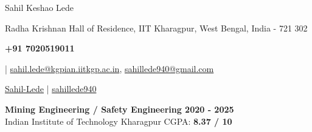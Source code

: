 \documentclass[10pt]{article}
\begin{document}
\begin{center}
    {\Huge Sahil Keshao Lede }\\
\end{center}
\vspace{-2.5ex}
\begin{center}
    {
    \small Radha Krishnan Hall of Residence, IIT Kharagpur, West Bengal, India - 721 302  

    \faMobile\hspace{0.2ex} \textbf{+91 7020519011} } |
    \Letter\hspace{0.2ex}
    \href{mailto:sahil.lede@kgpian.iitkgp.ac.in}{\small sahil.lede@kgpian.iitkgp.ac.in}, \href{mailto:sahillede940@gmail.com}{\small sahillede940@gmail.com}

    \faLinkedinSquare\hspace{0.2ex}     \href{https://www.linkedin.com/in/sahil-lede-092360214/}{\small Sahil-Lede} | 
    \faGithub\hspace{0.2ex}
    \href{https://github.com/sahillede940}{\small sahillede940}
\end{center}

\vspace{-1ex}
{\color{headliner} \spacedhrule{0.2ex}{2.0ex}}
\vspace{-1ex}
\large \textbf{Mining Engineering / Safety Engineering   {\hfill} 2020 - 2025}\normalsize\\
Indian Institute of Technology Kharagpur {\hfill}CGPA: \textbf{8.37 / 10}

\vspace{-1ex}
{\color{headliner} \spacedhrule{0.15ex}{1.0ex}}
\end{document}
